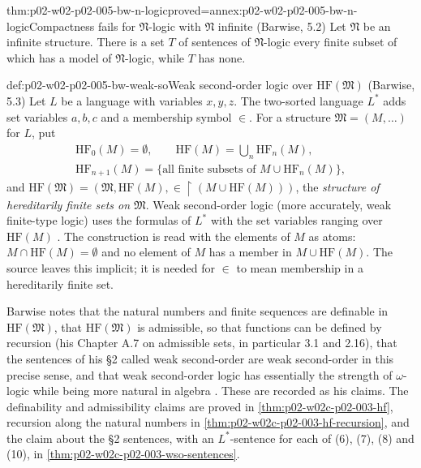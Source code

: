\begin{hbtheorem}{thm:p02-w02-p02-005-bw-n-logic}{proved=annex:p02-w02-p02-005-bw-n-logic}{Compactness fails for \(\mathfrak N\)-logic with \(\mathfrak N\) infinite (Barwise, 5.2)}
Let \(\mathfrak N\) be an infinite structure.  There is a set \(T\) of
sentences of \(\mathfrak N\)-logic every finite subset of which has a model
of \(\mathfrak N\)-logic, while \(T\) has none.
\end{hbtheorem}

\begin{hbdefinition}{def:p02-w02-p02-005-bw-weak-so}{Weak second-order logic over \(\mathrm{HF}(\mathfrak M)\) (Barwise, 5.3)}
Let \(L\) be a language with variables \(x,y,z\).  The two-sorted language
\(L^{*}\) adds set variables \(a,b,c\) and a membership symbol \(\in\).
For a structure \(\mathfrak M=(M,\ldots)\) for \(L\), put
\[
\begin{gathered}
\mathrm{HF}_0(M)=\emptyset,\qquad
\mathrm{HF}(M)=\bigcup_n\mathrm{HF}_n(M),\\
\mathrm{HF}_{n+1}(M)=\{\text{all finite subsets of }M\cup\mathrm{HF}_n(M)\},
\end{gathered}
\]
and \(\mathrm{HF}(\mathfrak M)=(\mathfrak M,\mathrm{HF}(M),\in\restriction(M\cup\mathrm{HF}(M)))\),
the \emph{structure of hereditarily finite sets on \(\mathfrak M\)}.  Weak
second-order logic (more accurately, weak finite-type logic) uses the
formulas of \(L^{*}\) with the set variables ranging over \(\mathrm{HF}(M)\)
\cite[ch.~A.1, \S5, 5.3, p.~43]{Barwise1977FirstOrder}.  The construction is
read with the elements of \(M\) as atoms: \(M\cap\mathrm{HF}(M)=\emptyset\)
and no element of \(M\) has a member in \(M\cup\mathrm{HF}(M)\).  The source
leaves this implicit; it is needed for \(\in\) to mean membership in a
hereditarily finite set.
\end{hbdefinition}

Barwise notes that the natural numbers and finite sequences are definable
in \(\mathrm{HF}(\mathfrak M)\), that \(\mathrm{HF}(\mathfrak M)\) is
admissible, so that functions can be defined by recursion (his Chapter A.7
on admissible sets, in particular 3.1 and 2.16), that the sentences of his
\S2 called weak second-order are weak second-order in this precise sense,
and that weak second-order logic has essentially the strength of
\(\omega\)-logic while being more natural in algebra
\cite[ch.~A.1, \S5, p.~43]{Barwise1977FirstOrder}.  These are recorded as
his claims.  The definability and admissibility claims are proved in
\cref{thm:p02-w02c-p02-003-hf}, recursion along the natural numbers in
\cref{thm:p02-w02c-p02-003-hf-recursion}, and the claim about the \S2
sentences, with an \(L^{*}\)-sentence for each of (6), (7), (8) and (10),
in \cref{thm:p02-w02c-p02-003-wso-sentences}.


